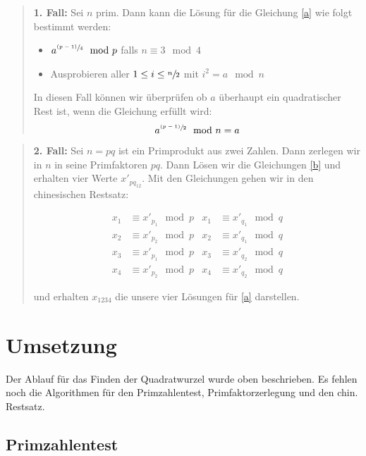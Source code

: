 \documentclass[11pt,a4paper]{scrartcl}
\begin{document}
\begin{quote}
	\textbf{1. Fall:}
	Sei $n$ prim. Dann kann die Lösung für die Gleichung \eqref{a} wie folgt bestimmt werden:
		\begin{itemize}
			\item $a^{\sfrac{(p-1)}{4}} \mod p$ falls $n \equiv 3 \mod 4$
			\item Ausprobieren aller $1 \le i \le \sfrac{n}{2}$ mit $i^2 =a \mod n$
		\end{itemize}
	
	In diesen Fall können wir überprüfen ob $a$ überhaupt ein quadratischer Rest ist, wenn die Gleichung  
	erfüllt wird:	
	\begin{equation}
		a^{\sfrac{(p-1)}{2}} \mod n = a
	\end{equation}
\end{quote}

\begin{quote}
	\textbf{2. Fall:}
		Sei $n=pq$ ist ein Primprodukt aus zwei Zahlen.
		Dann zerlegen wir in $n$ in seine Primfaktoren $pq$.
		Dann Lösen wir die Gleichungen \eqref{b} und erhalten vier Werte $x'_{pq_{12}}$.
		Mit den Gleichungen gehen wir in den chinesischen Restsatz:
		
		\begin{align}
			x_1 &\equiv x'_{p_1} \mod p & 	x_1 &\equiv x'_{q_1} \mod q \\
			x_2 &\equiv x'_{p_2} \mod p & 	x_2 &\equiv x'_{q_1} \mod q \\
			x_3 &\equiv x'_{p_1} \mod p & 	x_3 &\equiv x'_{q_2} \mod q \\
			x_4 &\equiv x'_{p_2} \mod p & 	x_4 &\equiv x'_{q_2} \mod q										
		\end{align}
		
		und erhalten $x_{1234}$ die unsere vier Lösungen für \eqref{a} darstellen.					
							
\end{quote}

\section{Umsetzung}

Der Ablauf für das Finden der Quadratwurzel wurde oben beschrieben. 
Es fehlen noch die Algorithmen für den Primzahlentest, Primfaktorzerlegung und den chin. Restsatz.

\subsection{Primzahlentest}
\end{document}
